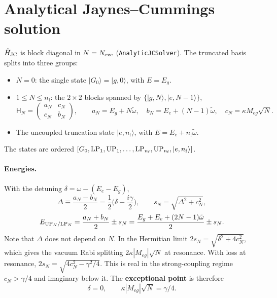 \documentclass[11pt]{article}
\newcommand{\ket}[1]{\lvert #1 \rangle}
\newcommand{\wt}{\tilde\omega}
\newcommand{\Hm}{\mathsf{H}}
\newcommand{\code}[1]{\texttt{#1}}
\newcommand{\nf}{n_{\mathrm f}}
\begin{document}
\section{Analytical Jaynes--Cummings solution}
$\hat H_{\rm JC}$ is block diagonal in $N=N_{\rm exc}$ (\code{AnalyticJCSolver}). The truncated basis splits into three groups:
\begin{itemize}
\item $N=0$: the single state $\ket{G_0}=\ket{g,0}$, with $E=E_g$.
\item $1\le N\le\nf$: the $2\times2$ blocks spanned by $\{\ket{g,N},\ket{e,N-1}\}$,
\begin{equation}
\Hm_N=\begin{pmatrix}a_N&c_N\\c_N&b_N\end{pmatrix},\qquad
a_N=E_g+N\wt,\quad b_N=E_e+(N-1)\wt,\quad c_N=\kappa M_{eg}\sqrt N .
\end{equation}
\item The uncoupled truncation state $\ket{e,\nf}$, with $E=E_e+\nf\wt$.
\end{itemize}
The states are ordered $[G_0,{\rm LP}_1,{\rm UP}_1,\dots,{\rm LP}_{\nf},{\rm UP}_{\nf},\ket{e,\nf}]$.

\paragraph{Energies.} With the detuning $\delta=\omega-(E_e-E_g)$,
\begin{equation}
\Delta\equiv\frac{a_N-b_N}{2}=\frac12\Big(\delta-\frac{i\gamma}{2}\Big),\qquad
s_N=\sqrt{\Delta^2+c_N^2},
\end{equation}
\begin{equation}
E_{{\rm UP}_N/{\rm LP}_N}=\frac{a_N+b_N}{2}\pm s_N
=\frac{E_g+E_e+(2N-1)\wt}{2}\pm s_N .
\end{equation}
Note that $\Delta$ does not depend on $N$. In the Hermitian limit $2s_N=\sqrt{\delta^2+4c_N^2}$, which gives the vacuum Rabi splitting $2\kappa|M_{eg}|\sqrt N$ at resonance. With loss at resonance, $2s_N=\sqrt{4c_N^2-\gamma^2/4}$. This is real in the strong-coupling regime $c_N>\gamma/4$ and imaginary below it. The \textbf{exceptional point} is therefore
\begin{equation}
\delta=0,\qquad \kappa|M_{eg}|\sqrt N=\gamma/4 .
\end{equation}
\end{document}
